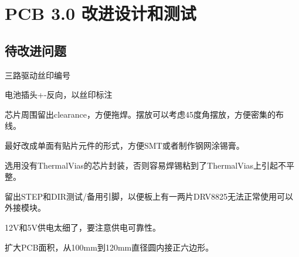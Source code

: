 \chapter{PCB 3.0 改进设计和测试}
\label{cha:PCB-v3}

\section{待改进问题}

三路驱动丝印编号

电池插头+-反向，以丝印标注

芯片周围留出clearance，方便拖焊。摆放可以考虑45度角摆放，方便密集的布线。

最好改成单面有贴片元件的形式，方便SMT或者制作钢网涂锡膏。

选用没有ThermalVias的芯片封装，否则容易焊锡粘到了ThermalVias上引起不平整。

留出STEP和DIR测试/备用引脚，以便板上有一两片DRV8825无法正常使用可以外接模块。

12V和5V供电太细了，要注意供电可靠性。

扩大PCB面积，从100mm到120mm直径圆内接正六边形。